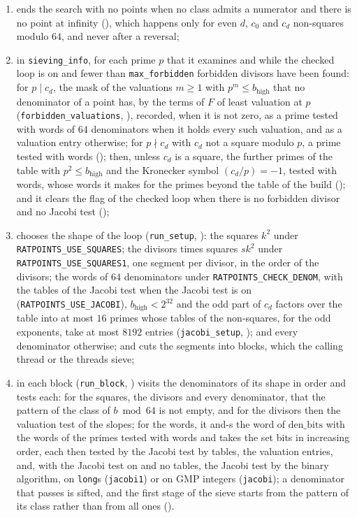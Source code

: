 \begin{enumerate}
    numerator;
  \item ends the search with no points when no class admits a numerator and there is no point at
    infinity (), which happens only for even $d$, $c_0$ and
    $c_d$ non-squares modulo $64$, and never after a reversal;
  \item in \verb|sieving_info|, for each prime $p$ that it examines and while the checked loop is on
    and fewer than \verb|max_forbidden| forbidden divisors have been found: for $p \mid c_d$, the
    mask of the valuations $m \ge 1$ with $p^m \le b_{\mathrm{high}}$ that no denominator of a point
    has, by the terms of $F$ of least valuation at $p$ (\verb|forbidden_valuations|,
    ), recorded, when it is not zero, as a prime tested with
    words of $64$ denominators when it holds every such valuation, and as a valuation entry
    otherwise; for $p \nmid c_d$ with $c_d$ not a square modulo $p$, a prime tested with words
    (); then, unless $c_d$ is a square, the further primes of the
    table with $p^2 \le b_{\mathrm{high}}$ and the Kronecker symbol $(c_d / p) = -1$, tested with
    words, whose words it makes for the primes beyond the table of the build
    (); and it clears the flag of the checked loop when there is
    no forbidden divisor and no Jacobi test ();
  \item chooses the shape of the loop (\verb|run_setup|, ): the
    squares $k^2$ under \verb|RATPOINTS_USE_SQUARES|; the divisors times squares $s k^2$ under
    \verb|RATPOINTS_USE_SQUARES1|, one segment per divisor, in the order of the divisors; the words
    of $64$ denominators under \verb|RATPOINTS_CHECK_DENOM|, with the tables of the Jacobi test
    when the Jacobi test is on (\verb|RATPOINTS_USE_JACOBI|), $b_{\mathrm{high}} < 2^{32}$ and the
    odd part of $c_d$ factors over the table into at most $16$ primes whose tables of the
    non-squares, for the odd exponents, take at most $8192$ entries (\verb|jacobi_setup|,
    ); and
    every denominator otherwise; and cuts the segments into blocks, which the calling thread or the
    threads sieve;
  \item in each block (\verb|run_block|, ) visits the
    denominators of its shape in order and tests each: for the squares, the divisors and every
    denominator, that the pattern of the class of $b \bmod 64$ is not empty, and for the divisors
    then the valuation test of the slopes; for the words, it and-s the word of
    $\mathrm{den\_bits}$ with the words of the primes tested with words and takes the set bits in
    increasing order, each then tested by the Jacobi test by tables, the valuation entries, and,
    with the Jacobi test on and no tables, the Jacobi test by the binary algorithm, on \verb|long|s
    (\verb|jacobi1|) or
    on GMP integers (\verb|jacobi|); a denominator that passes is sifted, and the first stage of the
    sieve starts from the pattern of its class rather than from all ones
    ().
\end{enumerate}
